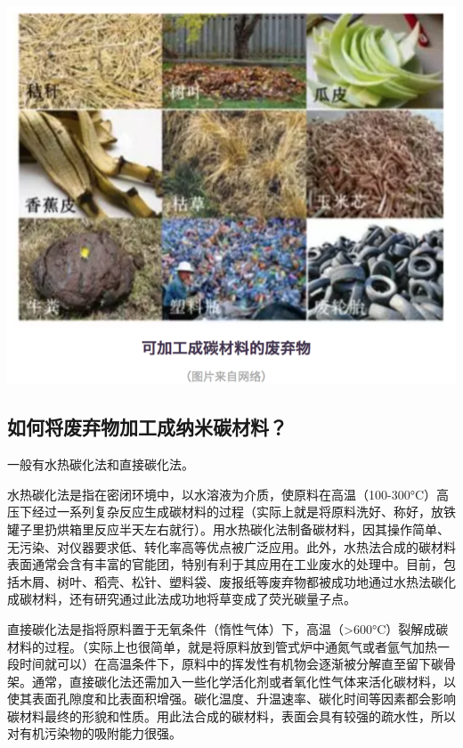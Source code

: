 \documentclass[
]{book}
\begin{document}
\includegraphics[width=8.33in]{images/nano2}

\hypertarget{ux5982ux4f55ux5c06ux5e9fux5f03ux7269ux52a0ux5de5ux6210ux7eb3ux7c73ux78b3ux6750ux6599}{%
\subsection{如何将废弃物加工成纳米碳材料？}\label{ux5982ux4f55ux5c06ux5e9fux5f03ux7269ux52a0ux5de5ux6210ux7eb3ux7c73ux78b3ux6750ux6599}}

一般有水热碳化法和直接碳化法。

水热碳化法是指在密闭环境中，以水溶液为介质，使原料在高温（100-300°C）高压下经过一系列复杂反应生成碳材料的过程（实际上就是将原料洗好、称好，放铁罐子里扔烘箱里反应半天左右就行）。用水热碳化法制备碳材料，因其操作简单、无污染、对仪器要求低、转化率高等优点被广泛应用。此外，水热法合成的碳材料表面通常会含有丰富的官能团，特别有利于其应用在工业废水的处理中。目前，包括木屑、树叶、稻壳、松针、塑料袋、废报纸等废弃物都被成功地通过水热法碳化成碳材料，还有研究通过此法成功地将草变成了荧光碳量子点。

直接碳化法是指将原料置于无氧条件（惰性气体）下，高温（\textgreater600°C）裂解成碳材料的过程。（实际上也很简单，就是将原料放到管式炉中通氮气或者氩气加热一段时间就可以）在高温条件下，原料中的挥发性有机物会逐渐被分解直至留下碳骨架。通常，直接碳化法还需加入一些化学活化剂或者氧化性气体来活化碳材料，以使其表面孔隙度和比表面积增强。碳化温度、升温速率、碳化时间等因素都会影响碳材料最终的形貌和性质。用此法合成的碳材料，表面会具有较强的疏水性，所以对有机污染物的吸附能力很强。
\end{document}

